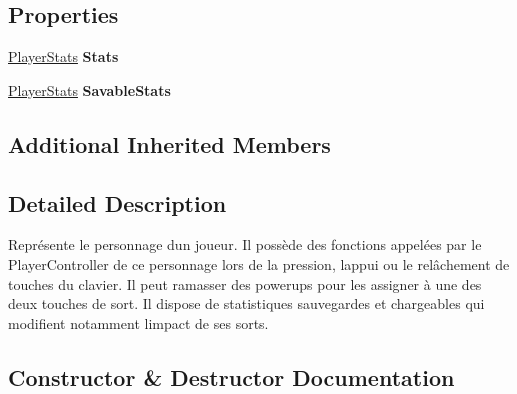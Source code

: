 \subsection*{Properties}
\begin{DoxyCompactItemize}
\item 
\mbox{\label{class_tentacle_slicers_1_1actors_1_1_player_character_a058059a644a1e097b56bb06b2bbaa2d4}} 
\hyperlink{class_tentacle_slicers_1_1actors_1_1_player_stats}{Player\+Stats} {\bfseries Stats}
\item 
\mbox{\label{class_tentacle_slicers_1_1actors_1_1_player_character_a0cec2778ca5c457df73ba4cd9b0a5f7c}} 
\hyperlink{class_tentacle_slicers_1_1actors_1_1_player_stats}{Player\+Stats} {\bfseries Savable\+Stats}
\end{DoxyCompactItemize}
\subsection*{Additional Inherited Members}


\subsection{Detailed Description}
Représente le personnage d\textquotesingle{}un joueur. Il possède des fonctions appelées par le Player\+Controller de ce personnage lors de la pression, l\textquotesingle{}appui ou le relâchement de touches du clavier. Il peut ramasser des powerups pour les assigner à une des deux touches de sort. Il dispose de statistiques sauvegardes et chargeables qui modifient notamment l\textquotesingle{}impact de ses sorts. 



\subsection{Constructor \& Destructor Documentation}
\mbox{\label{class_tentacle_slicers_1_1actors_1_1_player_character_a346e53738dbc763ad793e29635872823}} 
